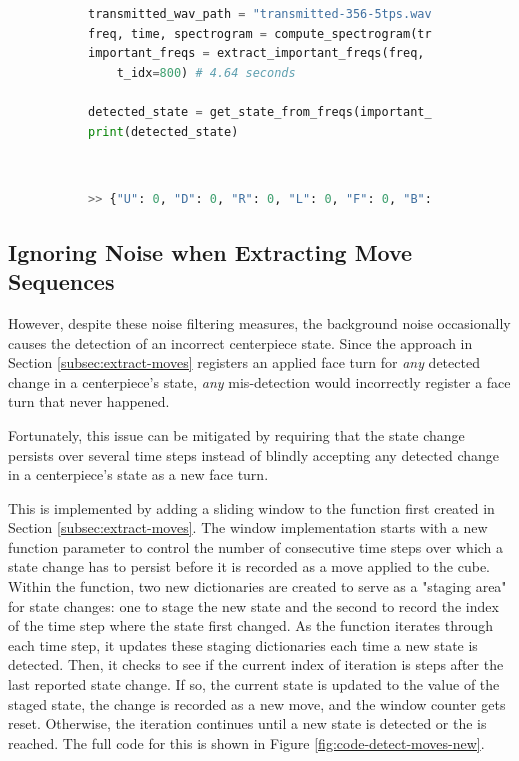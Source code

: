 \begin{figure}[h]
\caption{Example: Refined conversion of peak frequencies to states}
\label{fig:code-get-state-from-freqs-new-demo}
\begin{subfigure}{\textwidth}
\begin{lstlisting}[language=Python]
transmitted_wav_path = "transmitted-356-5tps.wav"
freq, time, spectrogram = compute_spectrogram(transmitted_wav_path)
important_freqs = extract_important_freqs(freq, time, spectrogram,
    t_idx=800) # 4.64 seconds

detected_state = get_state_from_freqs(important_freqs)
print(detected_state)
\end{lstlisting}
\end{subfigure}\\

\begin{subfigure}{\textwidth}
\begin{lstlisting}[language=Python, numbers=none]
>> {"U": 0, "D": 0, "R": 0, "L": 0, "F": 0, "B": 0}
\end{lstlisting}
\end{subfigure}
\end{figure}

\newpage
\subsection{Ignoring Noise when Extracting Move Sequences}
\label{subsec:ignoring-noise-when-extracting-move-sequences}
However, despite these noise filtering measures, the background noise occasionally causes the detection of an incorrect centerpiece state.
Since the approach in Section \ref{subsec:extract-moves} registers an applied face turn for \emph{any} detected change in a centerpiece's state, \emph{any} mis-detection would incorrectly register a face turn that never happened.

Fortunately, this issue can be mitigated by requiring that the state change persists over several time steps instead of blindly accepting any detected change in a centerpiece's state as a new face turn.

This is implemented by adding a sliding window to the  function first created in Section \ref{subsec:extract-moves}.
The window implementation starts with a new  function parameter to control the number of consecutive time steps over which a state change has to persist before it is recorded as a move applied to the cube.
Within the function, two new dictionaries are created to serve as a "staging area" for state changes: one to stage the new state and the second to record the index of the time step where the state first changed.
As the function iterates through each time step, it updates these staging dictionaries each time a new state is detected.
Then, it checks to see if the current index of iteration is  steps after the last reported state change.
If so, the current state is updated to the value of the staged state, the change is recorded as a new move, and the window counter gets reset.
Otherwise, the iteration continues until a new state is detected or the  is reached.
The full code for this is shown in Figure \ref{fig:code-detect-moves-new}.


